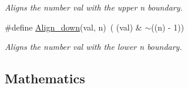 \begin{DoxyCompactItemize}
\begin{DoxyCompactList}\small\item\em Aligns the number {\itshape val} with the upper {\itshape n} boundary. \end{DoxyCompactList}\item 
\#define \hyperlink{group__group__xmega__utils_ga1070d94a69b4e1955ac1723b4f382095}{Align\-\_\-down}(val, n)~( (val)              \& $\sim$((n) -\/ 1))
\begin{DoxyCompactList}\small\item\em Aligns the number {\itshape val} with the lower {\itshape n} boundary. \end{DoxyCompactList}\end{DoxyCompactItemize}
\subsection*{Mathematics}
\label{_amgrp540b21ecdb276f5087ee585cedd6d5d0}%
